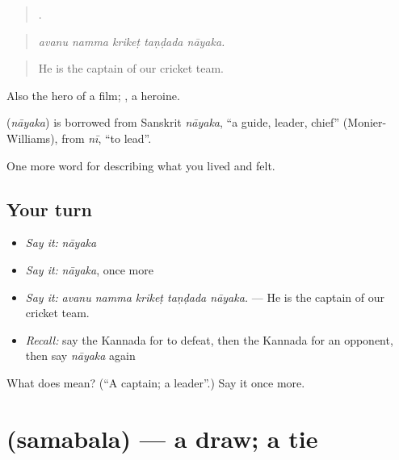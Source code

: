 \begin{quote}
    .
\end{quote}

\begin{quote}
\emph{avanu namma krikeṭ taṇḍada nāyaka.}
\end{quote}

\begin{quote}
He is the captain of our cricket team.
\end{quote}

Also the hero of a film; , a heroine.

\begin{cousinweb}
\textbf{} (\emph{nāyaka}) is borrowed from Sanskrit \emph{nāyaka}, \textquotedblleft{}a guide, leader, chief\textquotedblright{} (Monier-Williams), from \emph{nī}, \textquotedblleft{}to lead\textquotedblright{}.
\end{cousinweb}

\begin{grammarlens}[title={What you've built}]
One more word for describing what you lived and felt.
\end{grammarlens}

\subsection*{Your turn}
\begin{itemize}
\raggedright
  \item \emph{Say it:} \emph{nāyaka}
  \item \emph{Say it:} \emph{nāyaka}, once more
  \item \emph{Say it:} \emph{avanu namma krikeṭ taṇḍada nāyaka.} — He is the captain of our cricket team.
  \item \emph{Recall:} say the Kannada for to defeat, then the Kannada for an opponent, then say \emph{nāyaka} again
\end{itemize}

\begin{tcolorbox}[breakable,colback=teal!4,colframe=teal!35!black,title={Before you move on}]
What does  mean? (\textquotedblleft{}A captain; a leader\textquotedblright{}.) Say it once more.
\end{tcolorbox}
\section[\texorpdfstring{\kn{ಸಮಬಲ} (samabala)}{ಸಮಬಲ (samabala)}]{ (samabala) — a draw; a tie}

